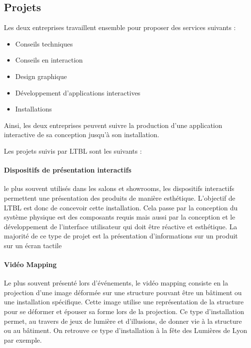 \documentclass{article}
\begin{document}
\subsection{Projets}

Les deux entreprises travaillent ensemble pour proposer des services suivants :

\begin{itemize}
    \item Conseils techniques
    \item Conseils en interaction
    \item Design graphique
    \item Développement d'applications interactives
    \item Installations
\end{itemize}

Ainsi, les deux entreprises peuvent suivre la production d'une application interactive de sa conception jusqu'à son installation.

\medskip

Les projets suivis par LTBL sont les suivants :

\paragraph{Dispositifs de présentation interactifs} le plus souvent utilisés dans les salons et showrooms, les dispositifs interactifs permettent une présentation des produits de manière esthétique.
L'objectif de LTBL est donc de concevoir cette installation.
Cela passe par la conception du système physique est des composants requis mais aussi par la conception et le développement de l'interface utilisateur qui doit être réactive et esthétique.
La majorité de ce type de projet est la présentation d'informations sur un produit sur un écran tactile

\paragraph{Vidéo Mapping} Le plus souvent présenté lors d'événements, le vidéo mapping consiste en la projection d'une image déformée sur une structure pouvant être un bâtiment ou une installation spécifique.
Cette image utilise une représentation de la structure pour se déformer et épouser sa forme lors de la projection.
Ce type d'installation permet, au travers de jeux de lumière et d'illusions, de donner vie à la structure ou au bâtiment.
On retrouve ce type d'installation à la fête des Lumières de Lyon par exemple.
\end{document}
